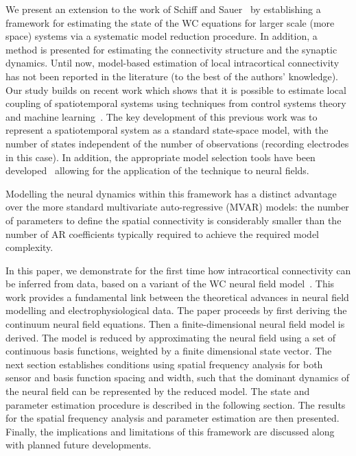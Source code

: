 \documentclass[10pt]{article}
\begin{document}
We present an extension to the work of Schiff and Sauer~\cite{schiff2008kalman} by establishing a framework for estimating the state of the WC equations for larger scale (more space) systems via a systematic model reduction procedure. In addition, a method is presented for estimating the connectivity structure and the synaptic dynamics. Until now, model-based estimation of local intracortical connectivity has not been reported in the literature (to the best of the authors' knowledge). Our study builds on recent work which shows that it is possible to estimate local coupling of spatiotemporal systems using techniques from control systems theory and machine learning~\cite{Dewar2009}. The key development of this previous work was to represent a spatiotemporal system as a standard state-space model, with the number of states independent of the number of observations (recording electrodes in this case). In addition, the appropriate model selection tools have been developed~\cite{Scerri2009} allowing for the application of the technique to neural fields. 

Modelling the neural dynamics within this framework has a distinct advantage over the more standard multivariate auto-regressive (MVAR) models: the number of parameters to define the spatial connectivity is considerably smaller than the number of AR coefficients typically required to achieve the required model complexity. 

In this paper, we demonstrate for the first time how intracortical connectivity can be inferred from data, based on a variant of the WC neural field model~\cite{Wilson1973}. This work provides a fundamental link between the theoretical advances in neural field modelling and electrophysiological data. The paper proceeds by first deriving the continuum neural field equations. Then a finite-dimensional neural field model is derived. The model is reduced by approximating the neural field using a set of continuous basis functions, weighted by a finite dimensional state vector. The next section establishes conditions using spatial frequency analysis for both sensor and basis function spacing and width, such that the dominant dynamics of the neural field can be represented by the reduced model. The state and parameter estimation procedure is described in the following section. The results for the spatial frequency analysis and parameter estimation are then presented. Finally, the implications and limitations of this framework are discussed along with planned future developments.
\end{document}
